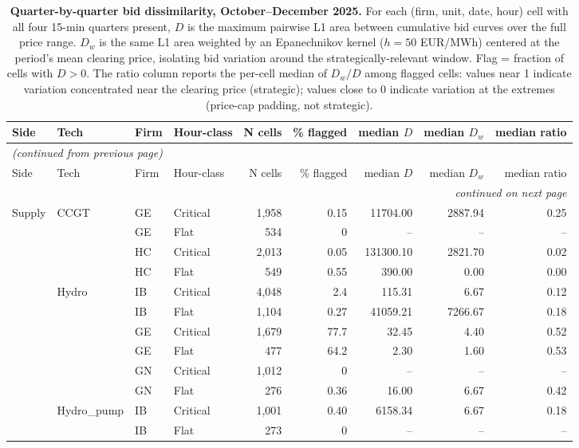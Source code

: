 \small
\begin{longtable}{@{}l l l l r r r r r@{}}
\caption{\textbf{Quarter-by-quarter bid dissimilarity, October--December 2025.} For each (firm, unit, date, hour) cell with all four 15-min quarters present, $D$ is the maximum pairwise L1 area between cumulative bid curves over the full price range. $D_w$ is the same L1 area weighted by an Epanechnikov kernel ($h = 50$ EUR/MWh) centered at the period's mean clearing price, isolating bid variation around the strategically-relevant window. Flag = fraction of cells with $D > 0$. The ratio column reports the per-cell median of $D_w/D$ among flagged cells: values near 1 indicate variation concentrated near the clearing price (strategic); values close to 0 indicate variation at the extremes (price-cap padding, not strategic).}\label{tab:quarter_dissim}\\
\toprule
Side & Tech & Firm & Hour-class & N cells & \% flagged & median $D$ & median $D_w$ & median ratio \\
\midrule
\endfirsthead
\multicolumn{9}{l}{\emph{(continued from previous page)}} \\
\toprule
Side & Tech & Firm & Hour-class & N cells & \% flagged & median $D$ & median $D_w$ & median ratio \\
\midrule
\endhead
\midrule
\multicolumn{9}{r}{\emph{continued on next page}} \\
\endfoot
\bottomrule
\endlastfoot
Supply & CCGT & GE & Critical & 1,958 & 0.15 & 11704.00 & 2887.94 & 0.25 \\
 &  & GE & Flat & 534 & 0 & -- & -- & -- \\
 &  & HC & Critical & 2,013 & 0.05 & 131300.10 & 2821.70 & 0.02 \\
 &  & HC & Flat & 549 & 0.55 & 390.00 & 0.00 & 0.00 \\
\addlinespace
 & Hydro & IB & Critical & 4,048 & 2.4 & 115.31 & 6.67 & 0.12 \\
 &  & IB & Flat & 1,104 & 0.27 & 41059.21 & 7266.67 & 0.18 \\
 &  & GE & Critical & 1,679 & 77.7 & 32.45 & 4.40 & 0.52 \\
 &  & GE & Flat & 477 & 64.2 & 2.30 & 1.60 & 0.53 \\
 &  & GN & Critical & 1,012 & 0 & -- & -- & -- \\
 &  & GN & Flat & 276 & 0.36 & 16.00 & 6.67 & 0.42 \\
\addlinespace
 & Hydro\_pump & IB & Critical & 1,001 & 0.40 & 6158.34 & 6.67 & 0.18 \\
 &  & IB & Flat & 273 & 0 & -- & -- & -- \\

\end{longtable}
